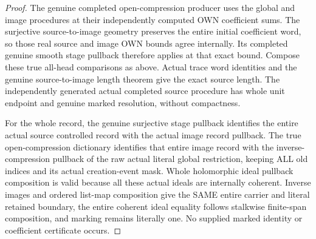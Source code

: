 \begin{proof}
The genuine completed open-compression producer uses the global and image procedures at their independently computed OWN coefficient sums. The surjective source-to-image geometry preserves the entire initial coefficient word, so those real source and image OWN bounds agree internally. Its completed genuine smooth stage pullback therefore applies at that exact bound. Compose these true all-head comparisons as above. Actual trace word identities and the genuine source-to-image length theorem give the exact source length. The independently generated actual completed source procedure has whole unit endpoint and genuine marked resolution, without compactness.

For the whole record, the genuine surjective stage pullback identifies the entire actual source controlled record with the actual image record pullback. The true open-compression dictionary identifies that entire image record with the inverse-compression pullback of the raw actual literal global restriction, keeping ALL old indices and its actual creation-event mask. Whole holomorphic ideal pullback composition is valid because all these actual ideals are internally coherent. Inverse images and ordered list-map composition give the SAME entire carrier and literal retained boundary, the entire coherent ideal equality follows stalkwise finite-span composition, and marking remains literally one. No supplied marked identity or coefficient certificate occurs.
\end{proof}

